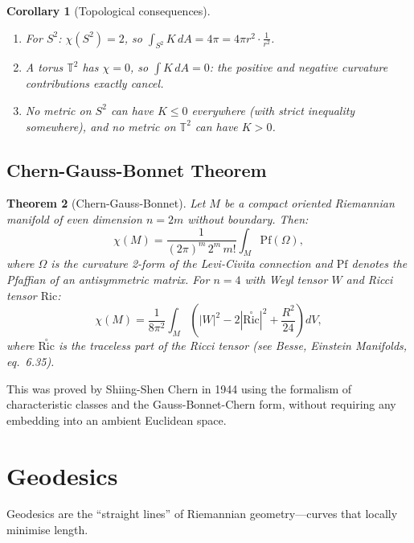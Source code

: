 \documentclass[12pt,a4paper]{amsart}
\newtheorem{theorem}{Theorem}[section]
\newtheorem{corollary}[theorem]{Corollary}
\theoremstyle{definition}
\begin{document}
\begin{corollary}[Topological consequences]
\begin{enumerate}[label=(\roman*)]
  \item For $S^2$: $\chi(S^2) = 2$, so $\int_{S^2} K\,dA = 4\pi = 4\pi r^2 \cdot \frac{1}{r^2}$.
  \item A torus $\mathbb{T}^2$ has $\chi = 0$, so $\int K\,dA = 0$: the
        positive and negative curvature contributions exactly cancel.
  \item No metric on $S^2$ can have $K \leq 0$ everywhere (with strict
        inequality somewhere), and no metric on $\mathbb{T}^2$ can have $K > 0$.
\end{enumerate}
\end{corollary}

\subsection{Chern-Gauss-Bonnet Theorem}

\begin{theorem}[Chern-Gauss-Bonnet]
\label{thm:chern-gauss-bonnet}
Let $M$ be a compact oriented Riemannian manifold of even dimension
$n = 2m$ without boundary. Then:
\[
  \chi(M) = \frac{1}{(2\pi)^m \, 2^m \, m!} \int_M \mathrm{Pf}(\Omega),
\]
where $\Omega$ is the curvature 2-form of the Levi-Civita connection
and $\mathrm{Pf}$ denotes the Pfaffian of an antisymmetric matrix.
For $n=4$ with Weyl tensor $W$ and Ricci tensor $\mathrm{Ric}$:
\[
  \chi(M) = \frac{1}{8\pi^2}\int_M
  \left(|W|^2 - 2|\overset{\circ}{\mathrm{Ric}}|^2
  + \frac{R^2}{24}\right) dV,
\]
where $\overset{\circ}{\mathrm{Ric}}$ is the traceless part of the Ricci tensor
(see Besse, \emph{Einstein Manifolds}, eq.~6.35).
\end{theorem}

This was proved by Shiing-Shen Chern in 1944 using the formalism of
characteristic classes and the Gauss-Bonnet-Chern form, without requiring
any embedding into an ambient Euclidean space.

\section{Geodesics}
\label{sec:geodesics}

Geodesics are the ``straight lines'' of Riemannian geometry---curves that
locally minimise length.
\end{document}

